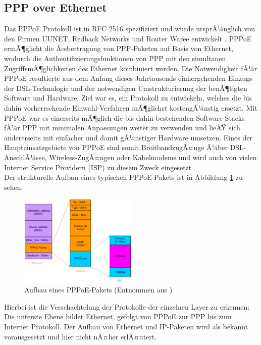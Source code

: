 \documentclass[journal]{IEEEtran}
\begin{document}
\subsection{PPP over Ethernet}
Das PPPoE Protokoll ist in RFC 2516 spezifiziert und wurde ursprÃ¼nglich
von den Firmen UUNET, Redback Networks und Router Waree entwickelt \cite{RFC2516}.
PPPoE ermÃ¶glicht die Ãœbertragung von PPP-Paketen auf Basis von Ethernet, wodurch
die Authentifizierungsfunktionen von PPP mit den
simultanen ZugriffsmÃ¶glichkeiten des Ethernet kombiniert werden.
Die Notwendigkeit fÃ¼r PPPoE resultierte aus dem Anfang dieses Jahrtausends
einhergehenden Einzugs der DSL-Technologie und der notwendigen Umstrukturierung
der benÃ¶tigten Software und Hardware. Ziel war es, ein Protokoll zu entwickeln,
welches die bis dahin vorherrschende Einwahl-Verfahren mÃ¶glichst kostengÃ¼nstig
ersetzt. Mit PPPoE war es einerseits mÃ¶glich die bis dahin bestehenden Software-Stacks fÃ¼r PPP
mit minimalen Anpassungen weiter zu verwenden und lieÃŸ sich andererseits mit einfacher
und damit gÃ¼nstiger Hardware umsetzen\cite{dslapp}.
Eines der Haupteinsatzgebiete von PPPoE sind somit BreitbandzugÃ¤nge Ã¼ber DSL-AnschlÃ¼sse,
Wireless-ZugÃ¤ngen oder Kabelmodems und wird
auch von vielen Internet Service Providern (ISP) zu diesem Zweck eingesetzt \cite[p.88]{cisconut}.\\
%
Der strukturelle Aufbau eines typischen PPPoE-Pakets ist in Abbildung \ref{fig:PPPoE_Bild} zu sehen.
\begin{figure}[h!]
 \centering
  \includegraphics[width=0.5\textwidth]{img/pppoe_aufbau.jpg}
 \caption{Aufbau eines PPPoE-Pakets (Entnommen aus \cite{PPPoEBild})}
 \label{fig:PPPoE_Bild}
\end{figure}
Hierbei ist die Verschachtelung der Protokolle der einzelnen Layer zu erkennen: Die unterste
Ebene bildet Ethernet, gefolgt von PPPoE zur PPP bis zum Internet Protokoll.
Der Aufbau von Ethernet und IP-Paketen wird als bekannt vorausgesetzt und hier nicht nÃ¤her erlÃ¤utert.\\
\end{document}
